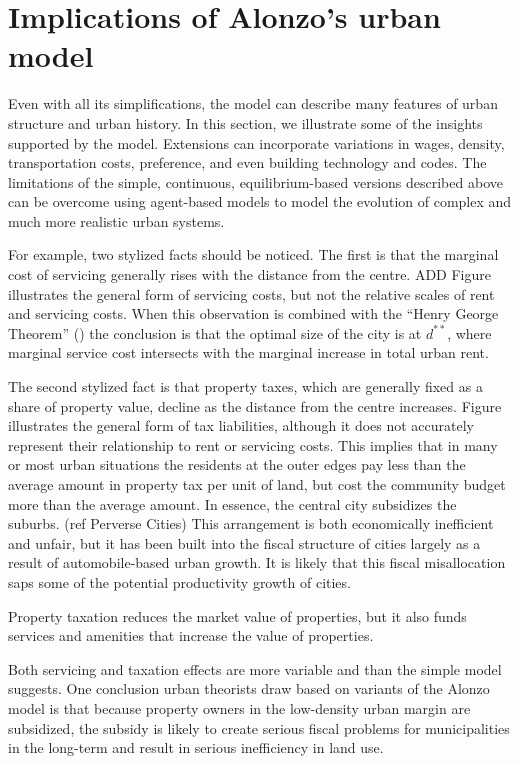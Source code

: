 \section{Implications of Alonzo's urban model}
Even with all its simplifications, the model  can  describe  many features of urban structure and urban history. In this section, we illustrate some of the insights supported by the model. Extensions can incorporate variations in wages, density, transportation costs,  preference, and even building technology and codes. The limitations of the simple, continuous, equilibrium-based versions described above can be overcome using agent-based models to model the evolution of complex and much more realistic urban systems. 

For example, two stylized facts should be noticed. The first is that the marginal cost of servicing generally  rises with the distance from the centre.  ADD Figure
illustrates the general form of servicing costs, but not  the relative scales of rent and servicing costs. When this observation is combined with the ``Henry George Theorem'' () the conclusion is that the optimal size of the city  is at  $d^{**}$, where marginal service cost intersects with the marginal increase in total urban rent. 

The second stylized fact is that property taxes, which are generally  fixed as a share of property value, decline as the distance from the centre increases. Figure %
illustrates the general form of tax liabilities, although it does not  accurately represent their relationship to rent or  servicing costs.  This implies that in many or most urban situations the residents at the outer edges pay less than the average amount in property tax per unit of land, but cost  the community budget more than the average amount. In essence, the central city subsidizes the suburbs. (ref Perverse Cities)
This arrangement is both economically inefficient and unfair, but it has been built into the fiscal structure of cities largely as a result of automobile-based urban growth. It is likely that this fiscal misallocation saps some of the potential productivity growth of cities.

Property taxation reduces the market value of properties, but it also funds services and amenities that increase the value of properties. 

Both servicing and taxation effects are more variable and than the simple model suggests.  One conclusion urban theorists draw based on variants of the Alonzo model is that because property owners in the low-density urban margin are subsidized,  the subsidy is likely to create serious fiscal problems for municipalities in the long-term and result in serious inefficiency in land use.

